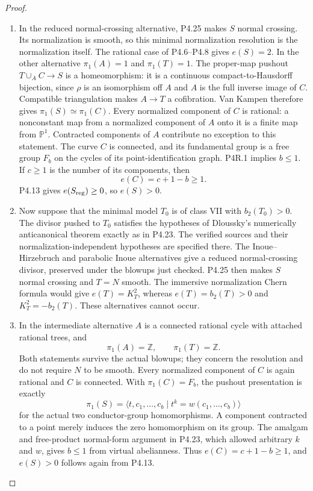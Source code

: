 \begin{proof}
\begin{enumerate}[label={$\langle1\rangle$\arabic*.},leftmargin=*]
\item In the reduced normal-crossing alternative,
P4.25 makes $S$ normal crossing. Its
normalization is smooth, so this minimal
normalization resolution is the
normalization itself. The rational case
of P4.6--P4.8 gives $e(S)=2$.
In the other alternative $\pi_1(A)=1$
and $\pi_1(T)=1$. The proper-map pushout
$T\cup_A C\to S$ is a homeomorphism:
it is a continuous compact-to-Hausdorff
bijection, since $\rho$ is an isomorphism
off $A$ and $A$ is the full inverse
image of $C$. Compatible triangulation
makes $A\to T$ a cofibration.
Van Kampen therefore gives
$\pi_1(S)\simeq\pi_1(C)$.
Every normalized component of $C$ is
rational: a nonconstant map from a
normalized component of $A$ onto it
is a finite map from $\mathbb P^1$.
Contracted components of $A$ contribute
no exception to this statement.
The curve $C$ is connected, and its
fundamental group is a free group
$F_b$ on the cycles of its
point-identification graph. P4R.1
implies $b\le1$. If $c\ge1$ is the
number of its components, then
\[
 e(C)=c+1-b\ge1.
\]
P4.13 gives $e(S_{\rm reg})\ge0$,
so $e(S)>0$.

\item Now suppose that the minimal model
$T_0$ is of class VII with
$b_2(T_0)>0$. The divisor pushed to
$T_0$ satisfies the hypotheses of
Dloussky's numerically anticanonical
theorem exactly as in P4.23.
The verified sources and their
normalization-independent hypotheses
are specified there. The
Inoue--Hirzebruch and parabolic Inoue
alternatives give a reduced
normal-crossing divisor, preserved
under the blowups just checked.
P4.25 then makes $S$ normal crossing
and $T=N$ smooth. The immersive
normalization Chern formula would
give $e(T)=K_T^2$, whereas
$e(T)=b_2(T)>0$ and
$K_T^2=-b_2(T)$. These alternatives
cannot occur.

\item In the intermediate alternative
$A$ is a connected rational cycle
with attached rational trees, and
\[
 \pi_1(A)=\mathbb Z,\qquad
 \pi_1(T)=\mathbb Z.
\]
Both statements survive the actual
blowups; they concern the resolution
and do not require $N$ to be smooth.
Every normalized component of $C$
is again rational and $C$ is connected.
With $\pi_1(C)=F_b$, the pushout
presentation is exactly
\[
 \pi_1(S)=
 \langle t,c_1,\ldots,c_b
 \mid t^k=w(c_1,\ldots,c_b)\rangle
\]
for the actual two conductor-group
homomorphisms. A component contracted
to a point merely induces the zero
homomorphism on its group. The
amalgam and free-product normal-form
argument in P4.23, which allowed
arbitrary $k$ and $w$, gives $b\le1$
from virtual abelianness.
Thus $e(C)=c+1-b\ge1$, and
$e(S)>0$ follows again from P4.13.


\end{enumerate}
\end{proof}
